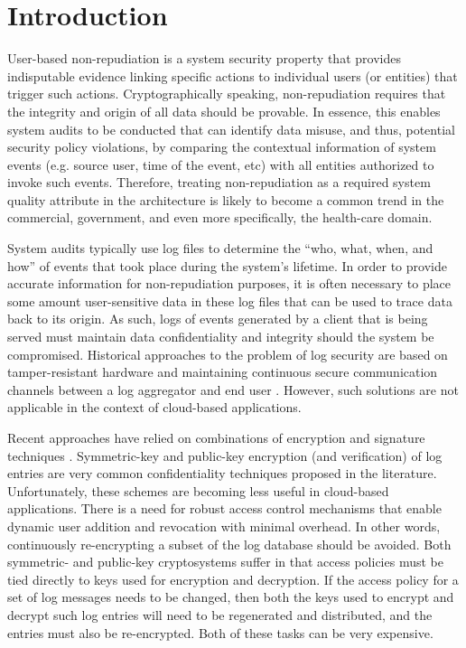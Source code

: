 \documentclass{sig-alternate}
\begin{document}
\section{Introduction}
User-based non-repudiation is a system security property that provides indisputable evidence linking
specific actions to individual users (or entities) that trigger such actions. Cryptographically speaking, 
non-repudiation requires that the integrity and 
origin of all data should be provable. In essence, this enables system audits to be conducted that can
identify data misuse, and thus, potential security policy violations, by comparing the contextual information 
of system events (e.g. source user, time of the event, etc) with all entities authorized to invoke such events. 
Therefore, treating non-repudiation as a required system quality attribute in the architecture is likely to 
become a common trend in the commercial, government, and even more specifically, the health-care domain.

System audits typically use log files to determine the ``who, what, when, and how'' of events that took 
place during the system's lifetime. In order to provide accurate information for non-repudiation purposes,
it is often necessary to place some amount user-sensitive data in these log files that can be used
to trace data back to its origin. As such, logs of events generated by a client that is being served must
maintain data confidentiality and integrity should the system be compromised. Historical approaches
to the problem of log security are based on tamper-resistant hardware and maintaining continuous 
secure communication channels between a log aggregator and end user \cite{Schneier1999-Secure}. 
However, such solutions are not applicable in the context of cloud-based applications. 

Recent approaches have relied on combinations of encryption and signature techniques \cite{Ma2008-FssAgg}. 
Symmetric-key and public-key encryption (and verification) of log entries are very common confidentiality techniques 
proposed in the literature. Unfortunately, these schemes are becoming less useful in cloud-based applications.
There is a need for robust access control mechanisms that enable dynamic user addition and revocation
with minimal overhead. In other words, continuously re-encrypting a subset of the log database should be avoided. 
Both symmetric- and public-key cryptosystems suffer in that access policies must be tied directly to keys used for
encryption and decryption. If the access policy for a set of log messages needs to be changed, then both the keys used to
encrypt and decrypt such log entries will need to be regenerated and distributed, and the entries must also
be re-encrypted. Both of these tasks can be very expensive. 
\end{document}
